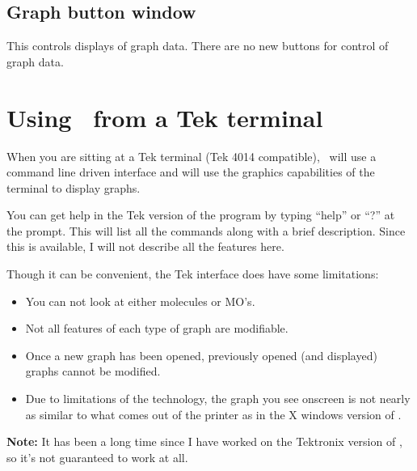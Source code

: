 \subsection{Graph button window}

This controls displays of graph data.  There are no new buttons for
control of graph data.

\section{Using \viewprog\ from a Tek terminal}

When you are sitting at a Tek terminal (Tek 4014 compatible),
\viewprog\ will use a command line driven interface and will use the
graphics capabilities of the terminal to display graphs. 

You can get help in the Tek version of the program by typing ``help''
or ``?'' at the prompt.  This will list all the commands along with a
brief description.  Since this is available, I will not describe all
the features here.

Though it can be convenient, the Tek interface does have some
limitations: 

\begin{itemize}
\item You can not look at either molecules or MO's.

\item Not all features of each type of graph are modifiable.

\item Once a new graph has been opened, previously opened (and
displayed) graphs cannot be modified.

\item Due to limitations of the technology, the graph you see onscreen
is not nearly as similar to what comes out of the printer as in
the X windows version of \viewprog.

\end{itemize}

{\bf Note:}  It has been a long time since I have worked on the
Tektronix version of \viewprog, so it's not guaranteed to work at all.

